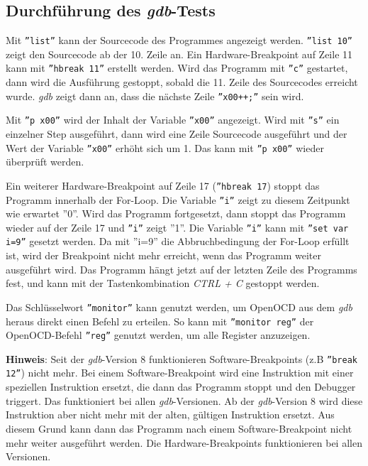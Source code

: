 \subsection{Durchführung des \textit{gdb}-Tests}
Mit \texttt{''list''} kann der Sourcecode des Programmes angezeigt werden.
\texttt{''list 10''} zeigt den Sourcecode ab der 10. Zeile an.
Ein Hardware-Breakpoint auf Zeile 11 kann mit \texttt{''hbreak 11''} erstellt werden.
Wird das Programm mit \texttt{''c''} gestartet, dann wird die Ausführung gestoppt, sobald die 11. Zeile des Sourcecodes erreicht wurde.
\textit{gdb} zeigt dann an, dass die nächste Zeile \texttt{''x00++;''} sein wird.

Mit \texttt{''p x00''} wird der Inhalt der Variable \texttt{''x00''} angezeigt.
Wird mit \texttt{''s''} ein einzelner Step ausgeführt, dann wird eine Zeile Sourcecode ausgeführt und der Wert der Variable \texttt{''x00''} erhöht sich um 1.
Das kann mit \texttt{''p x00''}  wieder überprüft werden.


Ein weiterer Hardware-Breakpoint auf Zeile 17 (\texttt{''hbreak 17}) stoppt das Programm innerhalb der For-Loop.
Die Variable \texttt{''i''} zeigt zu diesem Zeitpunkt wie erwartet ''0''.
Wird das Programm fortgesetzt, dann stoppt das Programm wieder auf der Zeile 17 und \texttt{''i''} zeigt ''1''.
Die Variable \texttt{''i''} kann mit \texttt{''set var i=9''} gesetzt werden.
Da mit ''i=9'' die Abbruchbedingung der For-Loop erfüllt ist, wird der Breakpoint nicht mehr erreicht, wenn das Programm weiter ausgeführt wird.
Das Programm hängt jetzt auf der letzten Zeile des Programms fest, und kann mit der Tastenkombination \textit{CTRL + C} gestoppt werden.

Das Schlüsselwort \texttt{''monitor''} kann genutzt werden, um OpenOCD aus dem \textit{gdb} heraus direkt einen Befehl zu erteilen.
So kann mit \texttt{''monitor reg''} der OpenOCD-Befehl \texttt{''reg''} genutzt werden, um alle Register anzuzeigen.

\textbf{Hinweis}: 
Seit der \textit{gdb}-Version 8 funktionieren Software-Breakpoints (z.B \texttt{''break 12''}) nicht mehr.
Bei einem Software-Breakpoint wird eine Instruktion mit einer speziellen Instruktion ersetzt, die dann das Programm stoppt und den Debugger triggert.
Das funktioniert bei allen \textit{gdb}-Versionen.
Ab der \textit{gdb}-Version 8 wird diese Instruktion aber nicht mehr mit der alten, gültigen Instruktion ersetzt.
Aus diesem Grund kann dann das Programm nach einem Software-Breakpoint nicht mehr weiter ausgeführt werden.
Die Hardware-Breakpoints funktionieren bei allen Versionen.


